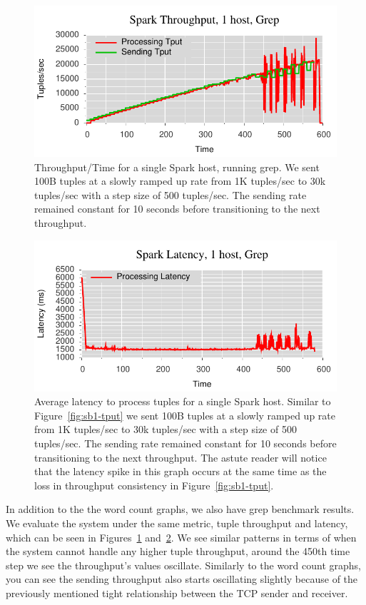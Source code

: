 \begin{figure}[t]
\centering
\includegraphics[width=1\linewidth]{figures/sp2_tput.pdf}
\caption{Throughput/Time for a single Spark host, running grep. We sent 100B tuples at a
slowly ramped up rate from 1K tuples/sec to 30k tuples/sec with a step size of
500 tuples/sec. The sending rate remained constant for 10 seconds before
transitioning to the next throughput.}
\label{fig:sp2-tput}
\end{figure}

\begin{figure}[t]
\centering
\includegraphics[width=1\linewidth]{figures/sp2_latency.pdf}
\caption{Average latency to process tuples for a single Spark host. Similar to
Figure~\ref{fig:sb1-tput} we sent 100B tuples at a slowly ramped up rate from 1K
tuples/sec to 30k tuples/sec with a step size of 500 tuples/sec. The sending
rate remained constant for 10 seconds before transitioning to the next
throughput. The astute reader will notice that the latency spike in this graph
occurs at the same time as the loss in throughput consistency in
Figure~\ref{fig:sb1-tput}.}
\label{fig:sp2-latency}
\end{figure}

In addition to the the word count graphs, we also have grep benchmark
results.  We evaluate the system under the same metric, tuple throughput and
latency, which can be seen in Figures~\ref{fig:sp2-tput}
and~\ref{fig:sp2-latency}. We see similar patterns in terms of when the system
cannot handle any higher tuple throughput, around the 450th time step we see
the throughput's values oscillate. Similarly to the word count graphs, you can
see the sending throughput also starts oscillating slightly because of the
previously mentioned tight relationship between the TCP sender and receiver.

